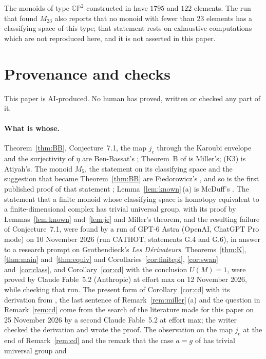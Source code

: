 \documentclass[11pt,a4paper]{article}
\theoremstyle{definition}
\newcommand{\CP}{\mathbb{CP}}
\begin{document}
The monoids of type $\CP^2$ constructed in \cite{BB} have $1795$ and $122$
elements. The run that found $M_{23}$ also reports that no monoid with fewer
than $23$ elements has a classifying space of this type; that statement
rests on exhaustive computations which are not reproduced here, and it is
not asserted in this paper.

\section{Provenance and checks}\label{sec:provenance}

This paper is AI-produced. No human has proved, written or checked any part
of it.

\paragraph{What is whose.} Theorem~\ref{thm:BB}, Conjecture~7.1, the map
$j_e$ through the Karoubi envelope and the surjectivity of $\eta$ are
Ben-Bassat's \cite{BB}; Theorem~B of \cite{Mi} is Miller's; (K3) is
Atiyah's. The monoid $M_5$, the statement on its classifying space and the
suggestion that became Theorem~\ref{thm:BB} are Fiedorowicz's \cite{Fie}, and
so is the first published proof of that statement \cite{Fie02};
Lemma~\ref{lem:known}\,(a) is McDuff's \cite{McD}. The statement that a
finite monoid whose classifying space is
homotopy equivalent to a finite-dimensional complex has trivial universal
group, with its proof by Lemmas~\ref{lem:known} and~\ref{lem:je} and
Miller's theorem, and the resulting failure of Conjecture~7.1, were found by
a run of GPT-6 Astra (OpenAI, ChatGPT Pro mode) on 10 November 2026 (run
CATHOT, statements G.4 and G.6), in answer to a research prompt on
Grothendieck's \emph{Les D\'erivateurs}. Theorems~\ref{thm:K},
\ref{thm:main} and~\ref{thm:equiv} and
Corollaries~\ref{cor:finitepi}, \ref{cor:swan} and~\ref{cor:class}, and
Corollary~\ref{cor:cd} with the conclusion $U(M)=1$, were proved by Claude
Fable~5.2 (Anthropic) at effort max on 12 November 2026, while checking that
run. The present form of Corollary~\ref{cor:cd} with its derivation from
\cite{GP}, the last sentence of Remark~\ref{rem:miller}\,(a) and the
question in Remark~\ref{rem:cd} come from the search of the literature made
for this paper on 25 November 2026 by a second Claude Fable~5.2 at effort
max; the writer checked the derivation and wrote the proof. The observation
on the map $j_e$ at the end of Remark~\ref{rem:cd} and the remark that the
case $a=g$ of \cite[Example~3.4]{BB} has trivial universal group and
\end{document}
